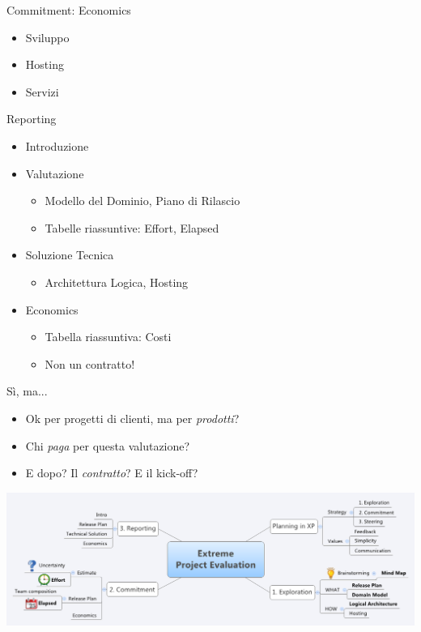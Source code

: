 \documentclass[compress, red, 14pt]{beamer}
\newcommand{\highlight}[1]{{\color{purple} \emph{#1}}}
\begin{document}
	\begin{frame}{Commitment: Economics}
		\begin{itemize}
			\item Sviluppo
			\item Hosting
			\item Servizi
		\end{itemize}

	\end{frame}
	
	\begin{frame}{Reporting}
		\begin{itemize}
			\item Introduzione
			\item Valutazione
			\begin{itemize}
				\item Modello del Dominio, Piano di Rilascio
				\item Tabelle riassuntive: Effort, Elapsed
			\end{itemize}
			\item Soluzione Tecnica
			\begin{itemize}
				\item Architettura Logica, Hosting
			\end{itemize}
			\item Economics
			\begin{itemize}
				\item Tabella riassuntiva: Costi
				\item Non un contratto!
			\end{itemize}
		\end{itemize}
	\end{frame}
	
	\begin{frame}{Sì, ma...}
		\begin{itemize}
			\item Ok per progetti di clienti, ma per \highlight{prodotti}?
			\item Chi \highlight{paga} per questa valutazione?
			\item E dopo? Il \highlight{contratto}? E il kick-off?
		\end{itemize}
		\begin{center}
			\hspace*{-0.6cm}
			\includegraphics[scale=0.31]{images/takeaway.png}
		\end{center}
	\end{frame}
	
\end{document}
